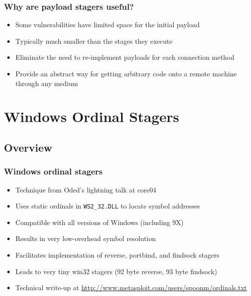 \documentclass{beamer}
\newenvironment{sitemize}{\vspace{1mm}\begin{itemize}\itemsep 4pt\small}{\end{itemize}}
\begin{document}
\begin{frame}[t]
    \frametitle{Why are payload stagers useful?}

    \begin{sitemize}
        \item Some vulnerabilities have limited space for the
        initial payload

        \pause
        \item Typically much smaller than the stages
        they execute

        \pause
        \item Eliminate the need to re-implement payloads for each
        connection method

        \pause
        \item Provide an abstract way for getting arbitrary code
        onto a remote machine through any medium
    \end{sitemize}
\end{frame}

\section{Windows Ordinal Stagers}

\subsection{Overview}
\begin{frame}[t]
    \frametitle{Windows ordinal stagers}

    \begin{sitemize}
        \item Technique from Oded's lightning talk at core04
        \item Uses static ordinals in \texttt{WS2\_32.DLL} to locate symbol
        addresses
        \item Compatible with all versions of Windows (including 9X)
        \item Results in very low-overhead symbol resolution
        \item Facilitates implementation of reverse, portbind, and
        findsock stagers
        \item Leads to very tiny win32 stagers (92 byte reverse, 93
        byte findsock)
        \item Technical write-up at
        \footnotesize{\url{http://www.metasploit.com/users/spoonm/ordinals.txt}}
    \end{sitemize}
\end{frame}
\end{document}
